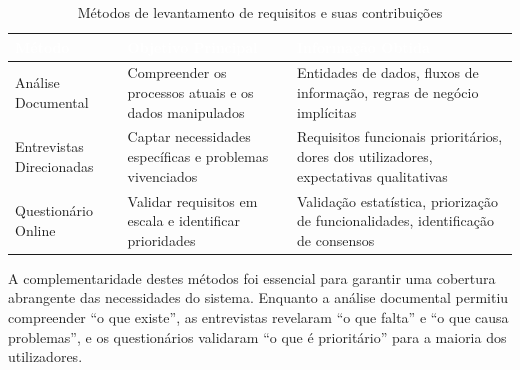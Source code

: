 \documentclass[a4paper,12pt]{scrreprt}
\begin{document}
\begin{table}[H]
\centering
\begin{tabular}{|p{3.5cm}|p{5cm}|p{6cm}|}
\hline
\rowcolor{headerblue}\textcolor{white}{\textbf{Método}} & \textcolor{white}{\textbf{Objetivo Principal}} & \textcolor{white}{\textbf{Informação Obtida}} \\ \hline
Análise Documental & Compreender os processos atuais e os dados manipulados & Entidades de dados, fluxos de informação, regras de negócio implícitas \\ \hline
Entrevistas Direcionadas & Captar necessidades específicas e problemas vivenciados & Requisitos funcionais prioritários, dores dos utilizadores, expectativas qualitativas \\ \hline
Questionário Online & Validar requisitos em escala e identificar prioridades & Validação estatística, priorização de funcionalidades, identificação de consensos \\ \hline
\end{tabular}
\caption{Métodos de levantamento de requisitos e suas contribuições}
\end{table}

A complementaridade destes métodos foi essencial para garantir uma cobertura abrangente das necessidades do sistema. Enquanto a análise documental permitiu compreender ``o que existe'', as entrevistas revelaram ``o que falta'' e ``o que causa problemas'', e os questionários validaram ``o que é prioritário'' para a maioria dos utilizadores.
\end{document}
